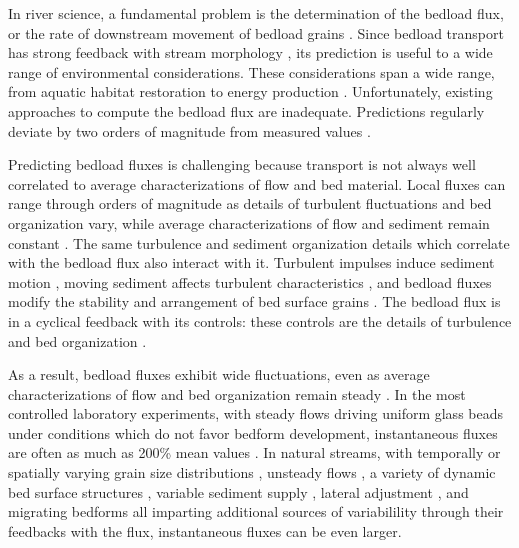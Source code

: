 In river science, a fundamental problem is the determination of the bedload flux, or the rate of downstream movement of bedload grains \citep{Ballio2014}.
Since bedload transport has strong feedback with stream morphology \citep{Church2006, Recking2016}, its prediction is useful to a wide range of environmental considerations. 
These considerations span a wide range, from aquatic habitat restoration to energy production \citep{Kondolf2014, Wohl2015a}. 
Unfortunately, existing approaches to compute the bedload flux are inadequate. 
Predictions regularly deviate by two orders of magnitude from measured values \citep{Gomez1989, Barry2004, Bathurst2007a, Recking2012}. 

Predicting bedload fluxes is challenging because transport is not always well correlated to average characterizations of flow and bed material. 
Local fluxes can range through orders of magnitude as details of turbulent fluctuations and bed organization vary, while average characterizations of flow and sediment remain constant \citep{Sumer2003, Charru2004, Hassan2008, Venditti2017}.
The same turbulence and sediment organization details which correlate with the bedload flux also interact with it. 
Turbulent impulses induce sediment motion \citep{Valyrakis2010, Celik2014, Amir2014, Shih2017}, moving sediment affects turbulent characteristics \citep{Singh2010, Santos2014, Liu2016}, and bedload fluxes modify the stability and arrangement of bed surface grains \citep{Kirchener1990, Charru2004, Hassan2008}.
The bedload flux is in a cyclical feedback with its controls: these controls are the details of turbulence and bed organization \citep{Jerolmack2005}. 

As a result, bedload fluxes exhibit wide fluctuations, even as average characterizations of flow and bed organization remain steady \citep{Ancey2014}.
In the most controlled laboratory experiments, with steady flows driving uniform glass beads under conditions which do not favor bedform development, instantaneous fluxes are often as much as 200\% mean values \citep{Bohm2004, Ancey2008, Heyman2014, Heyman2016}. 
In natural streams, with temporally or spatially varying grain size distributions \citep{Lisle1992, Chen2008}, unsteady flows \citep{Mao2012, FerrerBoix2015}, a variety of dynamic bed surface structures \citep{Hassan2008, Venditti2017}, variable sediment supply \citep{Madej2009, Elgueta2018}, lateral adjustment \citep{Pitlick2013, Redolfi2018}, and migrating bedforms \citep{Gomez1989, Dhont2018} all imparting additional sources of variabilility through their feedbacks with the flux, instantaneous fluxes can be even larger. 

